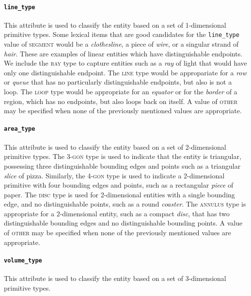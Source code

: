 \documentclass[11pt]{article}
\begin{document}
\paragraph{\texttt{line\_type}} %
\label{par:line_type}
This attribute is used to classify the entity based on a set of 1-dimensional primitive types. Some lexical items that are good candidates for the \texttt{line\_type} value of \textsc{segment} would be a \emph{clothesline}, a piece of \emph{wire}, or a singular strand of \emph{hair}. These are examples of linear entities which have distinguishable endpoints. We include the \textsc{ray} type to capture entities such as a \emph{ray} of light that would have only one distinguishable endpoint. The \textsc{line} type would be appropariate for a \emph{row} or \emph{queue} that has no particularly distinguishable endpoints, but also is not a loop. The \textsc{loop} type would be appropriate for an \emph{equator} or for the \emph{border} of a region, which has no endpoints, but also loops back on itself. A value of \textsc{other} may be specified when none of the previously mentioned values are appropriate.

\paragraph{\texttt{area\_type}} %
\label{par:area_type}
This attribute is used to classify the entity based on a set of 2-dimensional primitive types. The \textsc{3-gon} type is used to indicate that the entity is triangular, possessing three distinguishable bounding edges and points such as a triangular \emph{slice} of pizza. Similarly, the \textsc{4-gon} type is used to indicate a 2-dimensional primitive with four bounding edges and points, such as a rectangular \emph{piece} of paper. The \textsc{disc} type is used for 2-dimensional entities with a single bounding edge, and no distinguishable points, such as a round \emph{coaster}. The \textsc{annulus} type is appropriate for a 2-dimensional entity, such as a compact \emph{disc}, that has two distinguishable bounding edges and no distinguishable bounding points. A value of \textsc{other} may be specified when none of the previously mentioned values are appropriate.

\paragraph{\texttt{volume\_type}} %
\label{par:volume_type}
This attribute is used to classify the entity based on a set of 3-dimensional primitive types.
\end{document}
